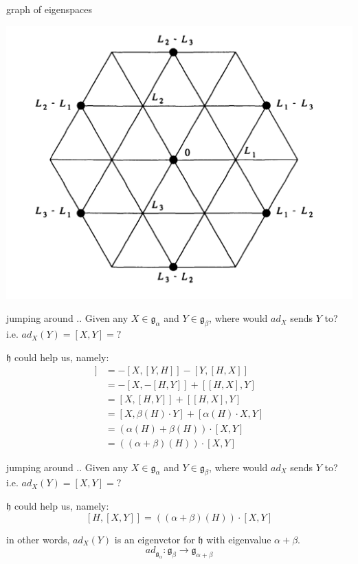 \documentclass{beamer}
\begin{document}
\begin{frame}{graph of eigenspaces}
\begin{center} \includegraphics[scale=.3]{eigenvalue.jpg}\end{center}	
\end{frame}

\begin{frame}{jumping around ..}
	Given any $X \in  \mathfrak{g}_{\alpha}$ and $Y \in \mathfrak{g}_{\beta}$, where would $ad_{X}$ sends $Y$ to? i.e.  $ad_{X}(Y) = [X,Y] = ?$

	$\mathfrak{h}$ could help us, namely:
	\begin{align*}
		[H,[X,Y]] &= -[X,[Y,H]] - [Y, [H,X]] \\
			  &= -[X, -[H,Y]] + [[H,X],Y] \\
			  &= [X,[H,Y]] + [[H,X],Y] \\
			  &= [X, \beta(H)\cdot Y] + [\alpha(H) \cdot X, Y] \\
			  &= (\alpha(H) + \beta(H)) \cdot [X,Y] \\
			  &= ((\alpha+\beta)(H)) \cdot [X,Y]
	\end{align*}
\end{frame}


\begin{frame}{jumping around ..}
	Given any $X \in  \mathfrak{g}_{\alpha}$ and $Y \in \mathfrak{g}_{\beta}$, where would $ad_{X}$ sends $Y$ to? i.e.  $ad_{X}(Y) = [X,Y] = ?$

	$\mathfrak{h}$ could help us, namely:
		\[[H,[X,Y]] = ((\alpha+\beta)(H)) \cdot [X,Y] \]

		in other words, $ad_{X}(Y)$ is an eigenvctor for $\mathfrak{h}$ with eigenvalue  $\alpha +\beta$.  \[
			ad_{\mathfrak{g}_{\alpha}}: \mathfrak{g}_{\beta} \to \mathfrak{g}_{\alpha+\beta}
		\] 
\end{frame}
\end{document}
